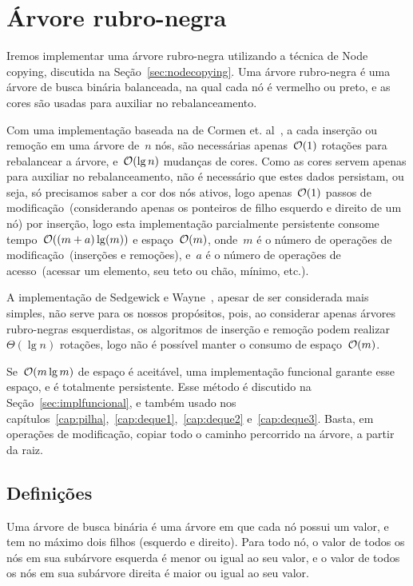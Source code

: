 \documentclass[../../main.tex]{subfiles}
\begin{document}
\chapter{Árvore rubro-negra} \label{cap:rubronegra}

Iremos implementar uma árvore rubro-negra utilizando a técnica de Node copying, discutida na Seção~\ref{sec:nodecopying}. Uma árvore rubro-negra é uma árvore de busca binária balanceada, na qual cada nó é vermelho ou preto, e as cores são usadas para auxiliar no rebalanceamento.

Com uma implementação baseada na de Cormen et. al~\cite{CormenRedBlack}, a cada inserção ou remoção em uma árvore de~$n$ nós, são necessárias apenas~$\mathcal{O}(1)$ rotações para rebalancear a árvore, e~$\mathcal{O}(\lg n)$ mudanças de cores. Como as cores servem apenas para auxiliar no rebalanceamento, não é necessário que estes dados persistam, ou seja, só precisamos saber a cor dos nós ativos, logo apenas~$\mathcal{O}(1)$ passos de modificação~(considerando apenas os ponteiros de filho esquerdo e direito de um nó) por inserção, logo esta implementação parcialmente persistente consome tempo~$\mathcal{O}((m + a) \lg(m))$ e espaço~$\mathcal{O}(m)$, onde~$m$ é o número de operações de modificação~(inserções e remoções), e~$a$ é o número de operações de acesso~(acessar um elemento, seu teto ou chão, mínimo, etc.).

A implementação de Sedgewick e Wayne~\cite{SedgewickRedBlack}, apesar de ser considerada mais simples, não serve para os nossos propósitos, pois, ao considerar apenas árvores rubro-negras esquerdistas, os algoritmos de inserção e remoção podem realizar~$\Theta(\lg n)$ rotações, logo não é possível manter o consumo de espaço~$\mathcal{O}(m)$.

Se~$\mathcal{O}(m \lg m)$ de espaço é aceitável, uma implementação funcional garante esse espaço, e é totalmente persistente. Esse método é discutido na Seção~\ref{sec:implfuncional}, e também usado nos capítulos~\ref{cap:pilha},~\ref{cap:deque1},~\ref{cap:deque2} e~\ref{cap:deque3}. Basta, em operações de modificação, copiar todo o caminho percorrido na árvore, a partir da raiz.

\section{Definições}

Uma árvore de busca binária é uma árvore em que cada nó possui um valor, e tem no máximo dois filhos (esquerdo e direito). Para todo nó, o valor de todos os nós em sua subárvore esquerda é menor ou igual ao seu valor, e o valor de todos os nós em sua subárvore direita é maior ou igual ao seu valor.
\end{document}

